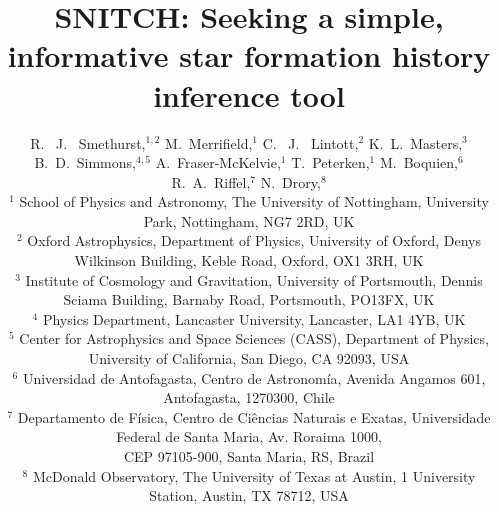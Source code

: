 \documentclass[useAMS,usenatbib]{mn2e}
\begin{document}
\title[\textsc{snitch}: inferring informative  SFHs]{SNITCH: Seeking a simple, informative star formation history inference tool}
\author[Smethurst et al. 2018]{R. ~J. ~Smethurst,$^{1,2}$ M.~Merrifield,$^{1}$ C. ~J. ~Lintott,$^{2}$ K.~L.~Masters,$^{3}$ B.~D.~Simmons,$^{4,5}$ \newauthor A.~Fraser-McKelvie,$^{1}$ T.~Peterken,$^{1}$ M.~Boquien,$^{6}$ R.~A.~Riffel,$^{7}$ N.~Drory,$^{8}$
\\ $^1$ School of Physics and Astronomy, The University of Nottingham, University Park, Nottingham, NG7 2RD, UK
\\ $^2$ Oxford Astrophysics, Department of Physics, University of Oxford, Denys Wilkinson Building, Keble Road, Oxford, OX1 3RH, UK
\\ $^3$ Institute of Cosmology and Gravitation, 
University of Portsmouth, Dennis Sciama Building, Barnaby Road, Portsmouth, PO13FX, UK
\\ $^4$ Physics Department, Lancaster University, Lancaster, LA1 4YB, UK
\\ $^5$ Center for Astrophysics and Space Sciences (CASS), Department of Physics, University of California, San Diego, CA 92093, USA
\\ $^6$ Universidad de Antofagasta, Centro de Astronom\'ia, Avenida Angamos 601, Antofagasta, 1270300, Chile
\\ $^7$ Departamento de Física, Centro de Ciências Naturais e Exatas,  Universidade Federal de Santa Maria, Av. Roraima 1000,\\ CEP 97105-900, Santa Maria, RS, Brazil 
\\ $^8$ McDonald Observatory, The University of Texas at Austin, 1 University Station, Austin, TX 78712, USA
}

\maketitle
\end{document}
